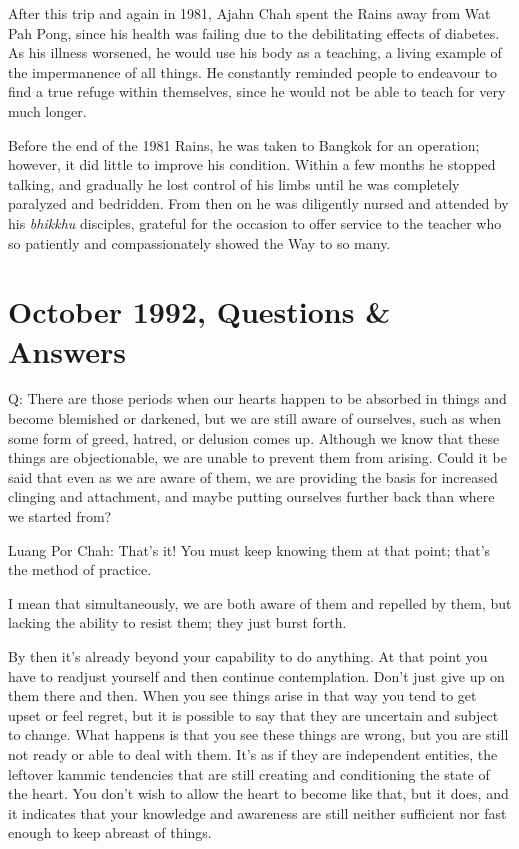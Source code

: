 After this trip and again in 1981, Ajahn Chah spent the Rains away from
Wat Pah Pong, since his health was failing due to the debilitating
effects of diabetes. As his illness worsened, he would use his body as a
teaching, a living example of the impermanence of all things. He
constantly reminded people to endeavour to find a true refuge within
themselves, since he would not be able to teach for very much longer. 

Before the end of the 1981 Rains, he was taken to Bangkok for an
operation; however, it did little to improve his condition. Within a few
months he stopped talking, and gradually he lost control of his limbs
until he was completely paralyzed and bedridden. From then on he was
diligently nursed and attended by his \emph{bhikkhu} disciples, grateful
for the occasion to offer service to the teacher who so patiently and
compassionately showed the Way to so many. 

\chapter{October 1992, Questions \& Answers}

Q: There are those periods when our hearts happen to be absorbed in
things and become blemished or darkened, but we are still aware of
ourselves, such as when some form of greed, hatred, or delusion comes
up. Although we know that these things are objectionable, we are unable
to prevent them from arising. Could it be said that even as we are aware
of them, we are providing the basis for increased clinging and
attachment, and maybe putting ourselves further back than where we
started from? 

Luang Por Chah: That's it! You must keep knowing them at that point; 
that's the method of practice. 

I mean that simultaneously, we are both aware of them and repelled by
them, but lacking the ability to resist them; they just burst forth. 

By then it's already beyond your capability to do anything. At that
point you have to readjust yourself and then continue contemplation. 
Don't just give up on them there and then. When you see things arise in
that way you tend to get upset or feel regret, but it is possible to say
that they are uncertain and subject to change. What happens is that you
see these things are wrong, but you are still not ready or able to deal
with them. It's as if they are independent entities, the leftover kammic
tendencies that are still creating and conditioning the state of the
heart. You don't wish to allow the heart to become like that, but it
does, and it indicates that your knowledge and awareness are still
neither sufficient nor fast enough to keep abreast of things. 

